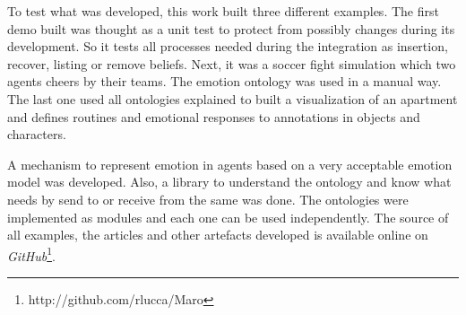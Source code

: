 To test what was developed, this work built three different examples. The
first demo built was thought as a unit test to protect from possibly changes during
its development. So it tests all processes needed during the integration as insertion,
recover, listing or remove beliefs. Next, it was a soccer fight simulation
which two agents cheers by their teams. The emotion ontology was used in a
manual way. The last one used all ontologies explained to built a
visualization of an apartment and defines routines and emotional responses to
annotations in objects and characters.

A mechanism to represent emotion in agents based on a very acceptable emotion
model was developed. Also, a library to understand the ontology and know what
needs by send to or receive from the same was done. The ontologies were
implemented as modules and each one can be used independently.
The source of all examples, the articles and other artefacts developed is
available online on \emph{GitHub}\footnote{http://github.com/rlucca/Maro}.

